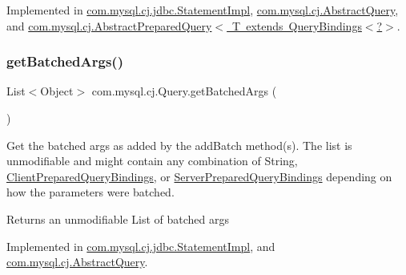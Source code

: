 Implemented in \mbox{\hyperlink{classcom_1_1mysql_1_1cj_1_1jdbc_1_1_statement_impl_af05f123c5cf2cf971f7d5a8929b7c962}{com.\+mysql.\+cj.\+jdbc.\+Statement\+Impl}}, \mbox{\hyperlink{classcom_1_1mysql_1_1cj_1_1_abstract_query_a25b6ff4c93ea4f35e116b1335c73a651}{com.\+mysql.\+cj.\+Abstract\+Query}}, and \mbox{\hyperlink{classcom_1_1mysql_1_1cj_1_1_abstract_prepared_query_a6bce42566c99020f4a260d78ffcc614f}{com.\+mysql.\+cj.\+Abstract\+Prepared\+Query$<$ T extends Query\+Bindings$<$?$>$}}.

\mbox{\label{interfacecom_1_1mysql_1_1cj_1_1_query_af927782ce04741b0b0d3447e9b4f2a08}} 
\subsubsection{\texorpdfstring{get\+Batched\+Args()}{getBatchedArgs()}}
{\footnotesize\ttfamily List$<$Object$>$ com.\+mysql.\+cj.\+Query.\+get\+Batched\+Args (\begin{DoxyParamCaption}{ }\end{DoxyParamCaption})}

Get the batched args as added by the add\+Batch method(s). The list is unmodifiable and might contain any combination of String, \mbox{\hyperlink{classcom_1_1mysql_1_1cj_1_1_client_prepared_query_bindings}{Client\+Prepared\+Query\+Bindings}}, or \mbox{\hyperlink{classcom_1_1mysql_1_1cj_1_1_server_prepared_query_bindings}{Server\+Prepared\+Query\+Bindings}} depending on how the parameters were batched.

\begin{DoxyReturn}{Returns}
an unmodifiable List of batched args 
\end{DoxyReturn}


Implemented in \mbox{\hyperlink{classcom_1_1mysql_1_1cj_1_1jdbc_1_1_statement_impl_a19609eb768e13632f7a8eb0fd14cdfd5}{com.\+mysql.\+cj.\+jdbc.\+Statement\+Impl}}, and \mbox{\hyperlink{classcom_1_1mysql_1_1cj_1_1_abstract_query_aef6b23f8de5efa38c0334c9245c346bf}{com.\+mysql.\+cj.\+Abstract\+Query}}.

\mbox{\label{interfacecom_1_1mysql_1_1cj_1_1_query_af99b8945b78c6f6cec21d9a81e227d1e}} 
